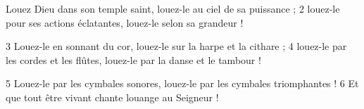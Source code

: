 Louez Dieu dans son temple saint,
louez-le au ciel de sa puissance ;
2 louez-le pour ses actions éclatantes,
louez-le selon sa grandeur !

3 Louez-le en sonnant du cor,
louez-le sur la harpe et la cithare ;
4 louez-le par les cordes et les flûtes,
louez-le par la danse et le tambour !

5 Louez-le par les cymbales sonores,
louez-le par les cymbales triomphantes !
6 Et que tout être vivant
chante louange au Seigneur !